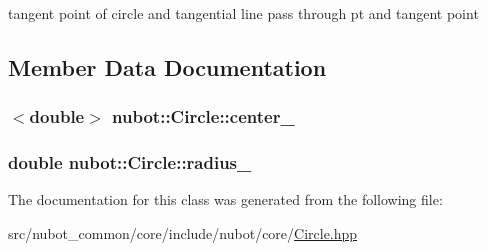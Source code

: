 tangent point of circle and tangential line pass through pt and tangent point 



\subsection{Member Data Documentation}
\hypertarget{classnubot_1_1Circle_aa65fe4a79dff4f07f6d024fa55edb6aa}{
\subsubsection[{center\-\_\-}]{$<$double$>$ nubot\-::\-Circle\-::center\-\_\-}}\label{classnubot_1_1Circle_aa65fe4a79dff4f07f6d024fa55edb6aa}
\hypertarget{classnubot_1_1Circle_a64d442408c8cb47a97c31017976722bb}{
\subsubsection[{radius\-\_\-}]{\setlength{\rightskip}{0pt plus 5cm}double nubot\-::\-Circle\-::radius\-\_\-}}\label{classnubot_1_1Circle_a64d442408c8cb47a97c31017976722bb}


The documentation for this class was generated from the following file\-:\begin{DoxyCompactItemize}
\item 
src/nubot\-\_\-common/core/include/nubot/core/\hyperlink{Circle_8hpp}{Circle.\-hpp}\end{DoxyCompactItemize}
